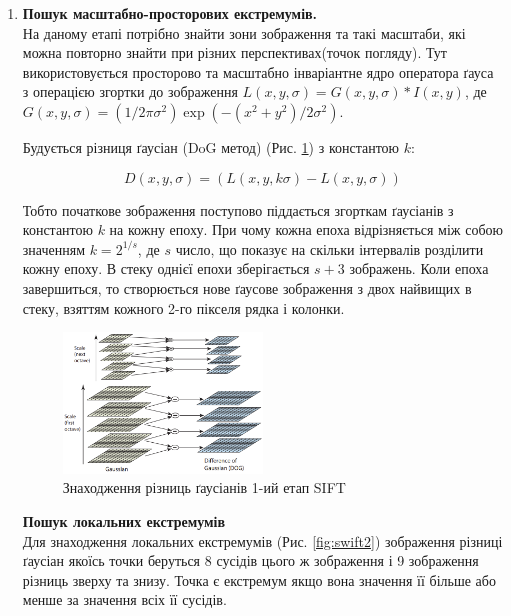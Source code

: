 \begin{enumerate}
    \item \textbf{Пошук масштабно-просторових екстремумів.}\\
          На даному етапі потрібно знайти зони зображення та такі масштаби, які можна повторно
          знайти при різних перспективах(точок погляду). Тут використовується просторово та
          масштабно інваріантне ядро оператора ґауса з операцією згортки
          до зображення $L(x,y,\sigma) = G(x,y,\sigma) \ast I(x,y)$,
          де $G(x,y,\sigma) = (1/2\pi\sigma^2)\exp({-(x^2+y^2)/2\sigma^2})$.


          Будується різниця ґаусіан (DoG метод) (Рис. \ref{fig:swift1}) з константою $k$:

          \begin{equation}
              D(x,y,\sigma) = (L(x,y,k\sigma) - L(x,y,\sigma))
          \end{equation}

          Тобто початкове зображення поступово піддається згорткам ґаусіанів з константою
          $k$ на кожну епоху. При чому кожна епоха відрізняється між собою значенням $k = 2^{1/s}$,
          де $s$ число, що показує на скільки інтервалів розділити кожну епоху.
          В стеку однієї епохи зберігається $s+3$ зображень. Коли епоха завершиться, то
          створюється нове ґаусове зображення з двох найвищих в стеку,
          взяттям кожного 2-го пікселя рядка і колонки.

          \begin{figure}[H]
              \centering
              \includegraphics[width=0.5\textwidth]{images/sift1}
              \caption{Знаходження різниць ґаусіанів 1-ий етап SIFT \cite{sift}
                  \label{fig:swift1}
              }
          \end{figure}

          \subitem \textbf{Пошук локальних екстремумів} \\
          Для знаходження локальних екстремумів (Рис. \ref{fig:swift2}) зображення
          різниці ґаусіан якоїсь точки беруться 8 сусідів цього ж зображення і 9 зображення
          різниць зверху та знизу. Точка є екстремум якщо вона значення її більше або менше за
          значення всіх її сусідів.


\end{enumerate}
